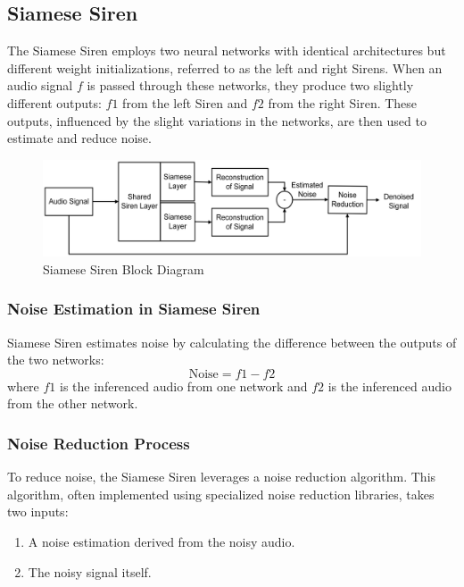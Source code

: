     \subsection{Siamese Siren}

    The Siamese Siren employs two neural networks with identical architectures but different weight initializations, referred to as the left and right Sirens. When an audio signal \( f \) is passed through these networks, they produce two slightly different outputs: \( f1 \) from the left Siren and \( f2 \) from the right Siren. These outputs, influenced by the slight variations in the networks, are then used to estimate and reduce noise.
    \begin{figure}[H]
        \centering
        \includegraphics[width=\linewidth]{assets/Siamese_Siren_Block_Diagram.png}
        \caption{Siamese Siren Block Diagram}
        \label{fig:Siamese_Siren_Block_Diagram}
    \end{figure}

    \subsubsection{Noise Estimation in Siamese Siren}
    
    Siamese Siren estimates noise by calculating the difference between the outputs of the two networks:
    \begin{equation}
        \text{Noise} = f1 - f2
    \end{equation}
    where \( f1 \) is the inferenced audio from one network and \( f2 \) is the inferenced audio from the other network.
    
    \subsubsection{Noise Reduction Process}
    
    To reduce noise, the Siamese Siren leverages a noise reduction algorithm. This algorithm, often implemented using specialized noise reduction libraries, takes two inputs:
    \begin{enumerate}
        \item A noise estimation derived from the noisy audio.
        \item The noisy signal itself.
    \end{enumerate}

